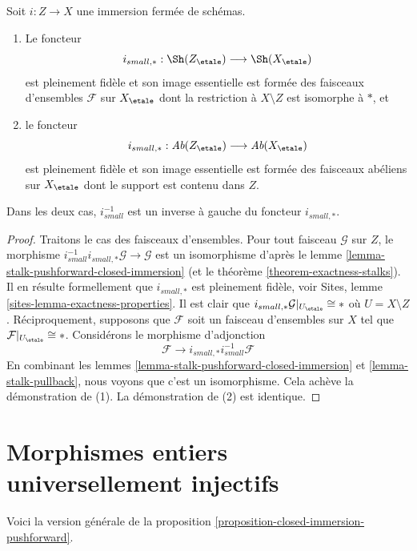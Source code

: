 \begin{proposition}
\label{proposition-closed-immersion-pushforward}
Soit $i : Z \to X$ une immersion ferm\'ee de sch\'emas.
\begin{enumerate}
\item Le foncteur
$$
i_{small, *} :
\Sh(Z_\etale)
\longrightarrow
\Sh(X_\etale)
$$
est pleinement fid\`ele et son image essentielle est form\'ee des faisceaux d'ensembles
$\mathcal{F}$ sur $X_\etale$ dont la restriction \`a $X \setminus Z$ est
isomorphe \`a $*$, et
\item le foncteur
$$
i_{small, *} :
\textit{Ab}(Z_\etale)
\longrightarrow
\textit{Ab}(X_\etale)
$$
est pleinement fid\`ele et son image essentielle est form\'ee des faisceaux ab\'eliens sur
$X_\etale$ dont le support est contenu dans $Z$.
\end{enumerate}
Dans les deux cas, $i_{small}^{-1}$ est un inverse \`a gauche du foncteur
$i_{small, *}$.
\end{proposition}

\begin{proof}
Traitons le cas des faisceaux d'ensembles.
Pour tout faisceau $\mathcal{G}$ sur $Z$, le morphisme
$i_{small}^{-1}i_{small, *}\mathcal{G} \to \mathcal{G}$
est un isomorphisme d'apr\`es
le lemme \ref{lemma-stalk-pushforward-closed-immersion}
(et
le th\'eor\`eme \ref{theorem-exactness-stalks}).
Il en r\'esulte formellement que $i_{small, *}$ est pleinement fid\`ele, voir
Sites, lemme \ref{sites-lemma-exactness-properties}.
Il est clair que $i_{small, *}\mathcal{G}|_{U_\etale} \cong *$
o\`u $U = X \setminus Z$. R\'eciproquement, supposons que $\mathcal{F}$
soit un faisceau d'ensembles sur $X$ tel que $\mathcal{F}|_{U_\etale} \cong *$.
Consid\'erons le morphisme d'adjonction
$$
\mathcal{F} \longrightarrow i_{small, *}i_{small}^{-1}\mathcal{F}
$$
En combinant
les lemmes \ref{lemma-stalk-pushforward-closed-immersion} et
\ref{lemma-stalk-pullback},
nous voyons que c'est un isomorphisme. Cela ach\`eve la d\'emonstration de (1).
La d\'emonstration de (2) est identique.
\end{proof}





\section{Morphismes entiers universellement injectifs}
\label{section-integral-universally-injective}

\noindent
Voici la version g\'en\'erale de la
proposition \ref{proposition-closed-immersion-pushforward}.

